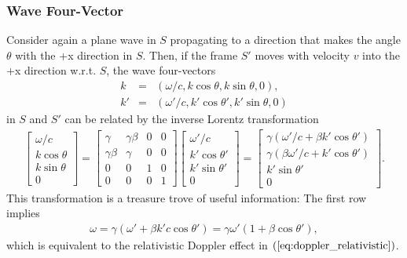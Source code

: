 \documentclass [12pt, a4paper] {article}
\begin{document}
\subsubsection{Wave Four-Vector}
Consider again a plane wave in $S$ propagating to a direction that makes the angle 
$\theta$ with the +x direction in $S$. Then, if the frame $S'$ moves with velocity 
$v$ into the +x direction w.r.t. $S$, the wave four-vectors 
\begin {eqnarray}
    k &=& (\omega/c, k\cos\theta, k\sin\theta, 0), \\
    k' &=& (\omega'/c, k'\cos \theta', k'\sin\theta, 0)
\end {eqnarray}
in $S$ and $S'$ can be related by the inverse Lorentz transformation \cite{steane}
\begin {eqnarray}
    \label{eq:wavevec_four}
    \begin {bmatrix}
        \omega/c \\ k\cos\theta \\ k\sin\theta \\ 0
    \end {bmatrix}
    =
    \begin {bmatrix}
        \gamma & \gamma\beta & 0 & 0 \\
        \gamma\beta & \gamma & 0 & 0 \\
        0 & 0 & 1 & 0 \\
        0 & 0 & 0 & 1
    \end {bmatrix}
    \begin {bmatrix}
        \omega'/c \\ k'\cos\theta' \\ k'\sin\theta' \\ 0
    \end {bmatrix}
    =
    \begin {bmatrix}
        \gamma(\omega'/c + \beta k'\cos\theta') \\
        \gamma(\beta\omega'/c + k'\cos\theta') \\
        k'\sin\theta' \\
        0
    \end {bmatrix}.
\end {eqnarray}
This transformation is a treasure trove of useful information: The first row implies
\begin {eqnarray}
    \omega = \gamma(\omega' + \beta k'c\cos\theta') = \gamma\omega'(1 + \beta\cos\theta'),
\end {eqnarray}
which is equivalent to the relativistic Doppler effect in $(\ref{eq:doppler_relativistic})$.
\end{document}
